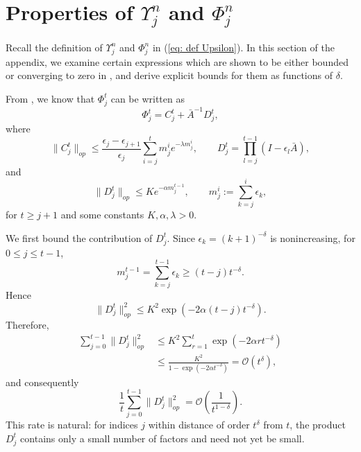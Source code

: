 \documentclass[11pt]{article}
\begin{document}
\section{Properties of $\Upsilon_j^n$ and $\Phi_j^n$}\label{sec: Upsilon}

Recall the definition of $\Upsilon_j^n$ and $\Phi_j^n$ in
(\ref{eq: def Upsilon}). In this section of the appendix, we examine
certain expressions which are shown to be either bounded or converging
to zero in \citep{polyak1992acceleration}, and derive explicit bounds
for them as functions of $\delta$.

From \cite[page 846]{polyak1992acceleration}, we know that $\Phi_j^t$
can be written as
\[
\Phi_j^t=C_j^t+\bar A^{-1}D_j^t,
\]
where
\[
\|C_j^t\|_{op}
\leq
\frac{\epsilon_j-\epsilon_{j+1}}{\epsilon_j}
\sum_{i=j}^t m_j^i e^{-\lambda m_j^i},
\qquad
D_j^t
=
\prod_{l=j}^{t-1}(I-\epsilon_l\bar A),
\]
and
\[
\|D_j^t\|_{op}
\leq
K e^{-\alpha m_j^{t-1}},
\qquad
m_j^i:=\sum_{k=j}^i \epsilon_k,
\]
for $t\geq j+1$ and some constants $K,\alpha,\lambda>0$.

We first bound the contribution of $D_j^t$. Since
$\epsilon_k=(k+1)^{-\delta}$ is nonincreasing, for $0\leq j\leq t-1$,
\[
m_j^{t-1}
=
\sum_{k=j}^{t-1}\epsilon_k
\geq
(t-j)t^{-\delta}.
\]
Hence
\[
\|D_j^t\|_{op}^2
\leq
K^2\exp\!\left(-2\alpha (t-j)t^{-\delta}\right).
\]
Therefore,
\begin{align*}
\sum_{j=0}^{t-1}\|D_j^t\|_{op}^2
&\leq
K^2\sum_{r=1}^{t}\exp\!\left(-2\alpha r t^{-\delta}\right)\\
&\leq
\frac{K^2}{1-\exp(-2\alpha t^{-\delta})}
=
\mathcal O(t^\delta),
\end{align*}
and consequently
\begin{equation}\label{eq: D-average-square}
\frac1t\sum_{j=0}^{t-1}\|D_j^t\|_{op}^2
=
\mathcal O\!\left(\frac1{t^{1-\delta}}\right).
\end{equation}
This rate is natural: for indices $j$ within distance of order
$t^\delta$ from $t$, the product $D_j^t$ contains only a small number of
factors and need not yet be small.
\end{document}

